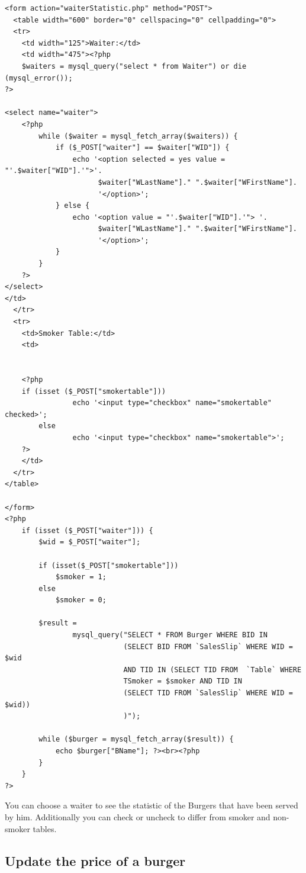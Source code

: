 \documentclass[10pt, a4paper]{article}
\begin{document}
\begin{lstlisting}[caption=waiterStatistic.php]
<form action="waiterStatistic.php" method="POST">
  <table width="600" border="0" cellspacing="0" cellpadding="0">
  <tr>
    <td width="125">Waiter:</td>
    <td width="475"><?php        
    $waiters = mysql_query("select * from Waiter") or die (mysql_error());
?>
    
<select name="waiter">            
    <?php
        while ($waiter = mysql_fetch_array($waiters)) {
            if ($_POST["waiter"] == $waiter["WID"]) {
                echo '<option selected = yes value = "'.$waiter["WID"].'">'. 
                      $waiter["WLastName"]." ".$waiter["WFirstName"].
                      '</option>';
            } else {
                echo '<option value = "'.$waiter["WID"].'"> '. 
                      $waiter["WLastName"]." ".$waiter["WFirstName"].
                      '</option>';
            }
        }
    ?>
</select>
</td>
  </tr>
  <tr>
    <td>Smoker Table:</td>
    <td>
    
    
    <?php
   	if (isset ($_POST["smokertable"]))
        		echo '<input type="checkbox" name="smokertable" checked>';
    	else
        		echo '<input type="checkbox" name="smokertable">';
    ?>
    </td>
  </tr>
</table>

</form>
<?php
    if (isset ($_POST["waiter"])) {
        $wid = $_POST["waiter"];
        
        if (isset($_POST["smokertable"])) 
            $smoker = 1;
        else
            $smoker = 0;
            
        $result = 
        		mysql_query("SELECT * FROM Burger WHERE BID IN 
                   			(SELECT BID FROM `SalesSlip` WHERE WID = $wid 
							AND TID IN (SELECT TID FROM  `Table` WHERE 
							TSmoker = $smoker AND TID IN 
                           	(SELECT TID FROM `SalesSlip` WHERE WID = $wid))
							)");
                   
        while ($burger = mysql_fetch_array($result)) {
            echo $burger["BName"]; ?><br><?php
        }        
    }
?>
\end{lstlisting}
You can choose a waiter to see the statistic of the Burgers that have been served by him. Additionally you 
can check or uncheck to differ from smoker and non-smoker tables.

\subsection{Update the price of a burger}
\end{document}

